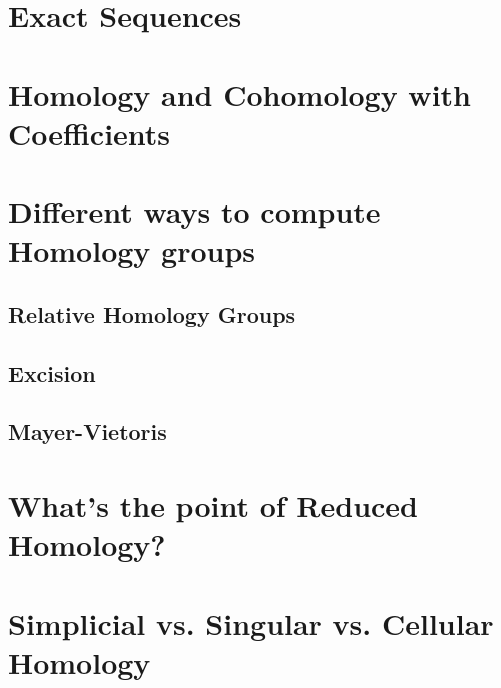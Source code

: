 \documentclass[11pt]{article}
\begin{document}
\section{Exact Sequences}

\newpage
\section{Homology and Cohomology with Coefficients}

\cite{Wilson12}

\newpage
\section{Different ways to compute Homology groups}

\subsection{Relative Homology Groups}


\subsection{Excision}


\subsection{Mayer-Vietoris}



\newpage
\section{What's the point of Reduced Homology?}





\newpage
\section{Simplicial vs. Singular vs. Cellular Homology}
\end{document}
